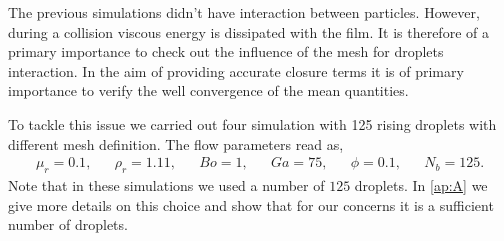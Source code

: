 
The previous simulations didn't have interaction between particles. 
However, during a collision viscous energy is dissipated with the film. 
It is therefore of a primary importance to check out the influence of the mesh for droplets interaction. 
In the aim of providing accurate closure terms it is of primary importance to verify the well convergence of the mean quantities.

To tackle this issue we carried out four simulation with 125 rising droplets with different mesh definition. 
The flow parameters read as,  
\begin{align*}
    \mu_r = 0.1,
    && \rho_r = 1.11,
    && Bo = 1,
    && Ga = 75,
    && \phi = 0.1,
    && N_b =125. 
\end{align*}
Note that in these simulations we used a number of $125$ droplets.  
In \ref{ap:A} we give more details on this choice and show that for our concerns it is a sufficient number of droplets. 

